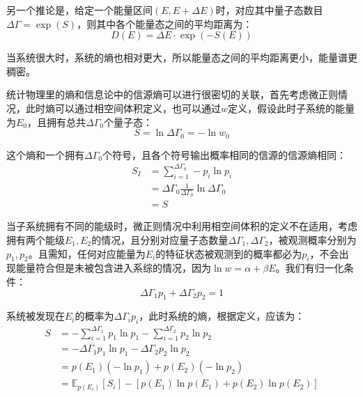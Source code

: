 \documentclass[UTF8]{ctexart}
\begin{document}
\begin{spacing}{2.0}
另一个推论是，给定一个能量区间$(E,E+\Delta E)$时，对应其中量子态数目$\Delta \Gamma = \exp(S)$，则其中各个能量态之间的平均距离为：
\begin{equation}
D(E)=\Delta E \cdot \exp(-S(E))
\end{equation}

当系统很大时，系统的熵也相对更大，所以能量态之间的平均距离更小，能量谱更稠密。

统计物理里的熵和信息论中的信源熵可以进行很密切的关联，首先考虑微正则情况，此时熵可以通过相空间体积定义，也可以通过$w$定义，假设此时子系统的能量为$E_{0}$，且拥有总共$\Delta \Gamma_{0}$个量子态：
\begin{equation}
S = \ln \Delta \Gamma_{0} = -\ln w_{0}
\end{equation}

这个熵和一个拥有$\Delta \Gamma_{0}$个符号，且各个符号输出概率相同的信源的信源熵相同：
\begin{equation}
\begin{aligned}
S_{I}&=\sum_{i=1}^{\Delta\Gamma_{0}}-p_{i}\ln p_{i}\\
&=\Delta \Gamma_{0} \frac{1}{\Delta \Gamma_{0}}\ln \Delta\Gamma_{0} \\
&=S
\end{aligned}
\end{equation}

当子系统拥有不同的能级时，微正则情况中利用相空间体积的定义不在适用，考虑拥有两个能级$E_{1},E_{2}$的情况，且分别对应量子态数量$\Delta\Gamma_{1},\Delta\Gamma_{2}$，被观测概率分别为$p_{1},p_{2}$。且需知，任何对应能量为$E_{i}$的特征状态被观测到的概率都必为$p_{i}$，不会出现能量符合但是未被包含进入系综的情况，因为$\ln w=\alpha+\beta E$。我们有归一化条件：
\begin{equation}
\Delta\Gamma_{1}p_{1}+\Delta\Gamma_{2}p_{2}=1
\end{equation}

系统被发现在$E_{i}$的概率为$\Delta\Gamma_{i}p_{i}$，此时系统的熵，根据定义，应该为：
\begin{equation}
\begin{aligned}
S&= -\sum_{i=1}^{\Delta\Gamma_{1}}p_{1}\ln p_{1} - \sum_{i=1}^{\Delta\Gamma_{2}}p_{2}\ln p_{2} \\
&= -\Delta\Gamma_{1}p_{1}\ln p_{1} - \Delta\Gamma_{2}p_{2}\ln p_{2} \\
&= p(E_{1})(-\ln p_{1}) + p(E_{2})(-\ln p_{2}) \\
&= \mathbb{E}_{p(E_{i})}\left[ S_{i} \right]-\left[p(E_{1})\ln p(E_{1})+p(E_{2})\ln p(E_{2}) \right]
\end{aligned}
\end{equation}


\end{spacing}
\end{document}
